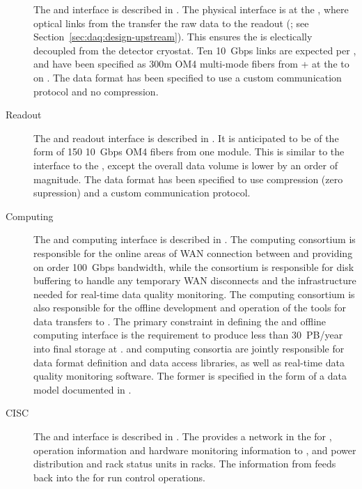 \begin{description}
\item[ ] The  and   interface is described in
. The physical interface is at the , where optical links from the  transfer
the raw  data to the   readout (; see
Section~\ref{sec:daq:design-upstream}). This ensures the  is electically decoupled from the detector
cryostat. Ten \SI{10}{Gbps} links are expected per , and have
been specified as 300m OM4 multi-mode fibers from + at the  to
 on . The data format has been specified
to use a custom communication protocol and no
compression.

\item[ Readout] The  and  readout interface is described in
. It is anticipated to
be of the form of 150  \SI{10}{Gbps} OM4 fibers from one  module. 
This
is similar to the interface to the  , except the overall
data volume is lower by an order of magnitude. The data format has been specified to use
compression (zero supression) and a custom communication protocol.

\item[Computing] The  and computing interface is described in .
 The computing consortium
 is responsible for the online areas of WAN connection between \surf and
\fnal providing on order \SI{100}{Gbps} bandwidth, while the  consortium is responsible for disk buffering
to handle any temporary WAN disconnects and the infrastructure needed
for real-time data quality monitoring.  The computing consortium 
is also
responsible for the offline development and operation of the tools for data
transfers to \fnal. The primary
constraint in defining the  and offline computing interface is the
requirement to produce less than \SI{30}{PB/year} 
into final storage at
\fnal.  and
computing consortia are jointly responsible for data
format definition and data access libraries, as well as real-time data
quality monitoring software. The former is specified in the form of a 
data model documented in .

\item[CISC] The  and  interface is described in
. The  provides a network in the  for ,  operation information and hardware
monitoring information to , and power distribution and
rack status units in  racks. The information from 
feeds back into the  for run control operations.


\end{description}
